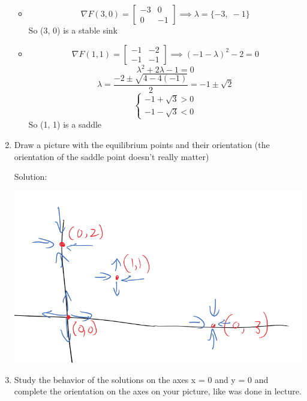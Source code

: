 \documentclass[12pt]{article}
\begin{document}
\begin{enumerate}
\begin{itemize}
        \item \[\nabla F(3, 0) = \begin{bmatrix}
            -3 & 0\\
            0 & -1
        \end{bmatrix} \implies \lambda = \{-3, \; -1\}\]
        So (3, 0) is a stable sink

        \item \[\nabla F(1, 1) = \begin{bmatrix}
            -1 & -2\\
            -1 & -1
        \end{bmatrix} \implies (-1 - \lambda)^2 - 2 = 0\]
        \[\lambda^2 + 2\lambda - 1 = 0\]
        \[\lambda = \frac{-2 \pm \sqrt{4 - 4(-1)}}{2} = -1 \pm \sqrt{2}\]
        \[\begin{cases}
            -1 + \sqrt{3} > 0\\
            -1 - \sqrt{3} < 0
        \end{cases}\]
        So (1, 1) is a saddle
    \end{itemize}

    \item Draw a picture with the equilibrium points and their orientation (the orientation of the saddle point doesn't really matter)
    
    Solution:
    \begin{center}
        \includegraphics[width=\textwidth]{Images/equilibria.png}
    \end{center}

    \item Study the behavior of the solutions on the axes x = 0 and y = 0 and complete the orientation on the axes on your picture, like was done in lecture.
    

\end{enumerate}
\end{document}
